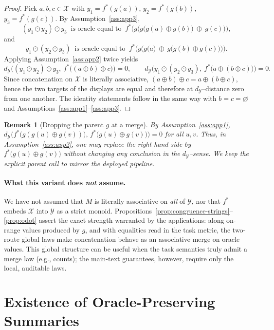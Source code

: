 \documentclass[11pt]{article}
\newtheorem{remark}{Remark}
\newcommand{\Strings}{\mathcal{X}}       %
\newcommand{\Y}{\mathcal{Y}}               %
\newcommand{\fstar}{f^*}               %
\newcommand{\concat}{\oplus}                    %
\newcommand{\metric}{d_{\Y}}
\newcommand{\emptystr}{\varnothing}              %
\begin{document}
\begin{proof}
Pick $a,b,c\in\Strings$ with $y_1=\fstar(g(a))$, $y_2=\fstar(g(b))$, $y_3=\fstar(g(c))$. By Assumption~\ref{ass:app3},
\[
(y_1\odot y_2)\odot y_3\ \text{ is oracle-equal to }\ \fstar\!\big(g\big(g\big(g(a)\concat g(b)\big)\ \concat\ g(c)\big)\big),
\]
and
\[
y_1\odot(y_2\odot y_3)\ \text{ is oracle-equal to }\ \fstar\!\big(g\big(g\big(a\big)\ \concat\ g\big(g(b)\concat g(c)\big)\big)\big).
\]
Applying Assumption~\ref{ass:app2} twice yields
\[
\metric\!\Big((y_1\odot y_2)\odot y_3,\ \fstar\big((a\concat b)\concat c\big)\Big)=0,\qquad
\metric\!\Big(y_1\odot (y_2\odot y_3),\ \fstar\big(a\concat(b\concat c)\big)\Big)=0.
\]
Since concatenation on $\Strings$ is literally associative, $(a\concat b)\concat c=a\concat(b\concat c)$, hence the two targets of the displays are equal and therefore at $\metric$–distance zero from one another. The identity statements follow in the same way with $b=c=\emptystr$ and Assumptions~\ref{ass:app1}–\ref{ass:app3}.
\end{proof}

\begin{remark}[Dropping the parent $g$ at a merge]
By Assumption~\ref{ass:app1}, $\metric\!\big(\fstar\!\big(g(g(u)\concat g(v))\big),\,\fstar\!\big(g(u)\concat g(v)\big)\big)=0$ for all $u,v$. Thus, in Assumption~\ref{ass:app2}, one may replace the right-hand side by $\fstar\!\big(g(u)\concat g(v)\big)$ without changing any conclusion in the $\metric$–sense. We keep the explicit parent call to mirror the deployed pipeline.
\end{remark}

\paragraph{What this variant does \emph{not} assume.} We have not assumed that $M$ is literally associative on \emph{all} of $\Y$, nor that $\fstar$ embeds $\Strings$ into $\Y$ as a strict monoid. Propositions~\ref{prop:congruence-strings}–\ref{prop:odot} assert the exact strength warranted by the applications: along on-range values produced by $g$, and with equalities read in the task metric, the two-route global laws make concatenation behave as an associative merge on oracle values. This global structure can be useful when the task semantics truly admit a merge law (e.g., counts); the main-text guarantees, however, require only the local, auditable laws.



\section{Existence of Oracle-Preserving Summaries}
\label{app:existence}
\end{document}
